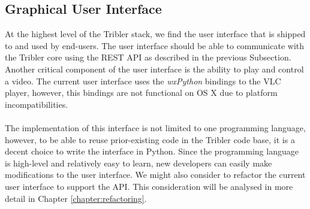 \subsection{Graphical User Interface}
At the highest level of the Tribler stack, we find the user interface that is shipped to and used by end-users. The user interface should be able to communicate with the Tribler core using the REST API as described in the previous Subsection. Another critical component of the user interface is the ability to play and control a video. The current user interface uses the \emph{wxPython} bindings to the VLC player, however, this bindings are not functional on OS X due to platform incompatibilities.\\\\
The implementation of this interface is not limited to one programming language, however, to be able to reuse prior-existing code in the Tribler code base, it is a decent choice to write the interface in Python. Since the programming language is high-level and relatively easy to learn, new developers can easily make modifications to the user interface. We might also consider to refactor the current user interface to support the API. This consideration will be analysed in more detail in Chapter \ref{chapter:refactoring}. 

